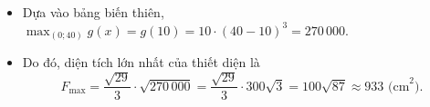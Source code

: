 \begin{ex}
{\begin{itemize}
			\begin{center}
			\end{center}
			\item Dựa vào bảng biến thiên, $\displaystyle \max_{(0; 40)} g(x) = g(10) = 10 \cdot (40 - 10)^3 = 270\,000$.
			\item Do đó, diện tích lớn nhất của thiết diện là
			\[ F_{\max} = \dfrac{\sqrt{29}}{3} \cdot \sqrt{270\,000} = \dfrac{\sqrt{29}}{3} \cdot 300\sqrt{3} = 100\sqrt{87} \approx 933 \text{ (cm}^2\text{)}.\]
		\end{itemize}
	}
\end{ex}

